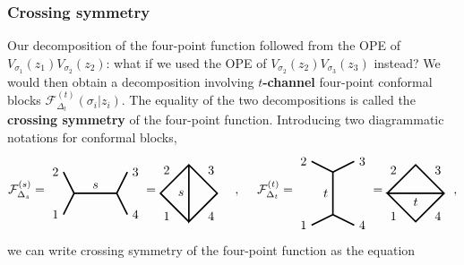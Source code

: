 \documentclass[12pt, a4paper, notitlepage, twoside]{report}
\numberwithin{equation}{section}
\theoremstyle{break}
\begin{document}
\subsubsection{Crossing symmetry}

Our decomposition of the four-point function followed from the OPE of $V_{\sigma_1}(z_1)V_{\sigma_2}(z_2)$: what if we used the OPE of $V_{\sigma_2}(z_2)V_{\sigma_3}(z_3)$ instead? We would then obtain a decomposition involving \textbf{\boldmath $t$-channel} four-point conformal blocks  $\mathcal{F}^{(t)}_{\Delta_t}(\sigma_i|z_i)$.
The equality of the two decompositions is called the \textbf{\boldmath crossing symmetry} of the four-point function.
Introducing two diagrammatic notations for conformal blocks, 
\begin{align}
 \mathcal{F}^{(s)}_{\Delta_s}  =  
\begin{tikzpicture}[baseline=(current  bounding  box.center), very thick, scale = .3]
\draw (-1,2) node [left] {$2$} -- (0,0) -- node [above] {$s$} (4,0) -- (5,2) node [right] {$3$};
\draw (-1,-2) node [left] {$1$} -- (0,0);
\draw (4,0) -- (5,-2) node [right] {$4$};
\end{tikzpicture}
=
\begin{tikzpicture}[baseline=(current  bounding  box.center), very thick, scale = .4]
\draw (0, -2) -- node [below left] {$1$} (-2, 0) -- node [above left] {$2$} (0, 2) -- node [above right] {$3$} (2, 0) -- node [below right] {$4$} (0, -2) -- node [left] {$s$} (0, 2); 
\end{tikzpicture}
\quad\ ,\quad\
 \mathcal{F}^{(t)}_{\Delta_t}  =  
\begin{tikzpicture}[baseline=(current  bounding  box.center), very thick, scale = .3]
 \draw (-2,3) node [left] {$2$} -- (0,2) -- node [left] {$t$} (0,-2) -- (-2, -3) node [left] {$1$};
\draw (0,2) -- (2,3) node [right] {$3$};
\draw (0,-2) -- (2, -3) node [right] {$4$};
\end{tikzpicture}
=
\begin{tikzpicture}[baseline=(current  bounding  box.center), very thick, scale = .4]
\draw (-2, 0) -- node [above left] {$2$} (0, 2) -- node [above right] {$3$} (2, 0) -- node [below right] {$4$} (0, -2) -- node [below left] {$1$} (-2, 0) -- node [below] {$t$} (2, 0); 
\end{tikzpicture}
\ \ ,
\label{ftfs}
\end{align}
we can write crossing symmetry of the four-point function as the equation
\end{document}
